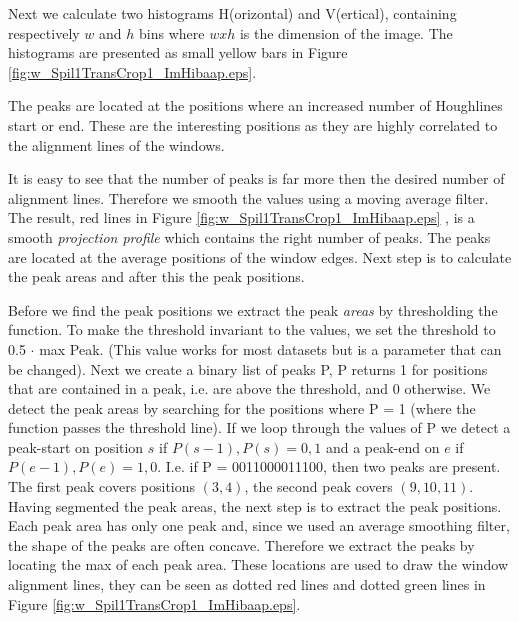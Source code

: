 Next we calculate two histograms H(orizontal) and V(ertical), containing respectively
$w$ and $h$ bins where $w x h$ is the dimension of the image.  The histograms
are presented as small yellow bars in Figure \ref{fig:w_Spil1TransCrop1_ImHibaap.eps}.

The peaks are located at the positions where an increased number of Houghlines
start or end.  These are the interesting positions as they are highly correlated
to the alignment lines of the windows. 

It is easy to see that the number of peaks is far more then the desired number of alignment lines.
Therefore we smooth the values using a moving average filter.
The result, red lines in Figure \ref{fig:w_Spil1TransCrop1_ImHibaap.eps}
, is a smooth \emph{projection profile} which contains the right number of peaks. The peaks
are located at the average positions of the window edges. Next step is to
calculate the peak areas and after this the peak positions. 

Before we find the peak positions we extract the peak \emph{areas} by thresholding the
function. To make the threshold invariant to the values, we set the threshold to 0.5 $\cdot$ max Peak. 
(This value works for most datasets but is a parameter that can be changed).
Next we create a binary list of peaks P, P returns 1 for positions that are contained in
a peak, i.e. are above the threshold, and 0 otherwise.
We detect the peak areas by searching for the positions where P = 1
(where the function passes the threshold line). 
If we loop through the values of P we detect a peak-start on position $s$ if ${P(s-1),P(s)}={0,1}$
and a peak-end on $e$ if ${P(e-1),P(e)}={1,0}$. 
I.e. if P = 0011000011100, then two peaks are present. The first peak covers positions $(3,4)$, 
the second peak covers $(9,10,11)$.\\

Having segmented the peak areas, the next step is to extract the peak positions. 
Each peak area has only one peak and, since we used an average smoothing filter, the shape of 
the peaks are often concave. Therefore we extract the peaks by locating the max of each peak area. 
These locations are used to draw the window alignment lines, they can be seen
as dotted red lines and dotted green lines in Figure \ref{fig:w_Spil1TransCrop1_ImHibaap.eps}.


